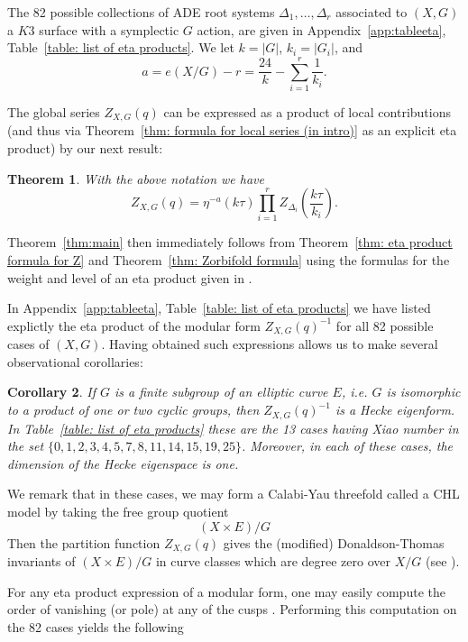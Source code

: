 \documentclass{article}
\newtheorem{theorem}{Theorem}[section]
\newtheorem{corollary}[theorem]{Corollary}
\theoremstyle{definition}
\begin{document}
The 82 possible collections of ADE root systems $\Delta_{1},\dots
,\Delta_{r}$ associated to $(X,G)$ a $K3$ surface with a symplectic
$G$ action, are given in Appendix~\ref{app:tableeta},
Table~\ref{table: list of eta products}. We let $k=|G|$,
$k_{i}=|G_{i}|$, and
\[
a = e(X/G) - r=\frac{24}{k}-\sum_{i=1}^{r} \frac{1}{k_{i}}.
\]

The global series $Z_{X,G}(q)$ can be expressed as a product of local
contributions (and thus via Theorem~\ref{thm: formula for local series
(in intro)} as an explicit eta product) by our next result:
\begin{theorem}\label{thm: eta product formula for Z}
With the above notation we have
\[
Z_{X,G}(q) = \eta^{-a}(k\tau )\prod_{i=1}^{r}
Z_{\Delta_{i}}\left(\frac{k\tau}{k_{i}} \right).
\]
\end{theorem}

Theorem~\ref{thm:main} then immediately follows from Theorem~\ref{thm:
eta product formula for Z} and Theorem~\ref{thm: Zorbifold formula}
using the formulas for the weight and level of an eta product given in
\cite[\S~2.1]{kohler2011eta}.



In Appendix~\ref{app:tableeta}, Table~\ref{table: list of eta
products} we have listed explictly the eta product of the modular form
$Z_{X,G}(q)^{-1}$ for all 82 possible cases of $(X,G)$.  Having
obtained such expressions allows us to make several observational
corollaries:

\begin{corollary}\label{cor: if G is a subgp of E then Zinv is a Hecke
eigenform} If $G$ is a finite subgroup of an elliptic curve $E$,
i.e. $G$ is isomorphic to a product of one or two cyclic groups, then
$Z_{X,G}(q)^{-1}$ is a Hecke eigenform. In Table~\ref{table: list of
eta products} these are the 13 cases having Xiao number in the set
$\{0,1,2,3,4,5,7,8,11,14,15,19,25 \}$. Moreover, in each of these
cases, the dimension of the Hecke eigenspace is one.
\end{corollary}

We remark that in these cases, we may form a Calabi-Yau threefold
called a CHL model by taking the free group quotient
\[
(X\times E)/G
\]
Then the partition function $Z_{X,G}(q)$ gives the (modified)
Donaldson-Thomas invariants of $(X\times E)/G$ in curve classes which
are degree zero over $X/G$ (see \cite{bryan2018chl}).


For any eta product expression of a modular form, one may easily
compute the order of vanishing (or pole) at any of the cusps
\cite[Cor~2.2]{kohler2011eta}. Performing this computation on the 82
cases yields the following
\end{document}
